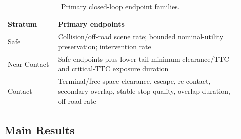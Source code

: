 \documentclass{article} %
\begin{document}
\begin{table}[t]
\centering
\caption{Primary closed-loop endpoint families.}
\label{tab:regime_metrics}
\begin{tabular}{p{0.20\linewidth}p{0.72\linewidth}}
\toprule
Stratum & Primary endpoints \\
\midrule
Safe & Collision/off-road scene rate; bounded nominal-utility preservation; intervention rate \\
Near-Contact & Safe endpoints plus lower-tail minimum clearance/TTC and critical-TTC exposure duration \\
Contact & Terminal/free-space clearance, escape, re-contact, secondary overlap, stable-stop quality, overlap duration, off-road rate \\
\bottomrule
\end{tabular}
\end{table}

\subsection{Main Results}
\begin{table}[t]
\centering
\caption{Three-regime closed-loop results for the frozen submitted planner.}
\label{tab:main_results}
\setlength{\tabcolsep}{4pt}
\end{table}
\end{document}
